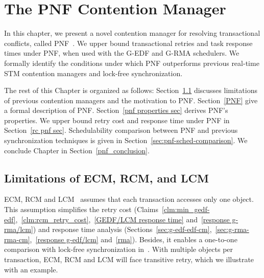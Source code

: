 \chapter{\label{ch_pnf}The PNF Contention Manager}


In this chapter, we present a novel contention manager for resolving transactional conflicts, called PNF~\cite{pnf_emsoft12}. We upper bound transactional retries and task response times under PNF, when used with the G-EDF and  G-RMA schedulers. We formally identify the conditions under which PNF outperforms previous real-time STM contention managers and lock-free synchronization.

The rest of this Chapter is organized as follows: Section~\ref{probelm description} discusses limitations of previous contention managers and the motivation to PNF. Section~\ref{PNF} give a formal description of PNF. Section~\ref{pnf properties sec} derives PNF's properties. We upper bound retry cost and response time under PNF in Section~\ref{rc pnf sec}. Schedulability comparison between PNF and previous synchronization techniques is given in Section~\ref{sec:pnf-sched-comparison}. We conclude Chapter in Section~\ref{pnf_conclusion}.


\section{Limitations of ECM, RCM, and LCM}\label{probelm description}

ECM, RCM and LCM~\cite{stmconcurrencycontrol:emsoft11,lcmdac2012} assumes that each transaction accesses only one object. This assumption simplifies the retry cost (Claims~\ref{clm:min_gedf-edf},~\ref{clm:rcm_retry_cost},~\ref{GEDF/LCM response time} and~\ref{response g-rma/lcm}) and response time analysis (Sections~\ref{sec:g-edf-edf-cm},~\ref{sec:g-rma-rma-cm},~\ref{response g-edf/lcm} and~\ref{rma}). Besides, it enables a one-to-one comparison with lock-free synchronization in~\cite{key-5}. With multiple objects per transaction, ECM, RCM and LCM will face transitive retry, which we illustrate with an example.


